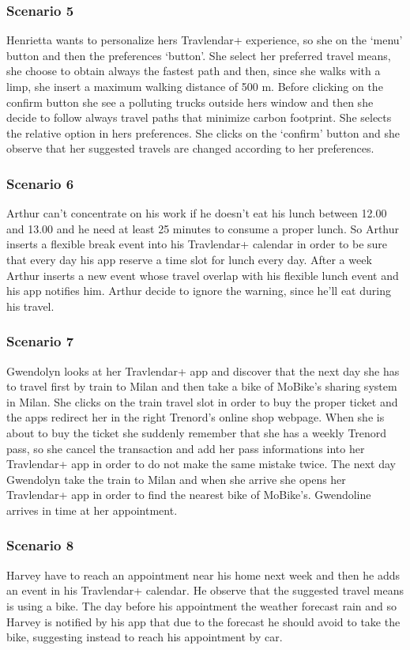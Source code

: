 	\subsubsection{Scenario 5}
		Henrietta wants to personalize hers Travlendar+ experience, so she on the ‘menu’ button and then the preferences ‘button’. She select her preferred travel means, she choose to obtain always the fastest path and then, since she walks with a limp, she insert a maximum walking distance of 500 m. Before clicking on the confirm button she see a polluting trucks outside hers window and then she decide to follow always travel paths that minimize carbon footprint. She selects the relative option in hers preferences. She clicks on the ‘confirm’ button and she observe that her suggested travels are changed according to her preferences.
	\subsubsection{Scenario 6}
		Arthur can’t concentrate on his work if he doesn't eat his lunch between 12.00 and 13.00 and he need at least 25 minutes to consume a proper lunch.
So Arthur inserts a flexible break event into his Travlendar+ calendar in order to be sure that every day his app reserve a time slot for lunch every day.
After a week Arthur inserts a new event whose travel overlap with his flexible lunch event and his app notifies him. Arthur decide to ignore the warning, since he'll eat during his travel.
	\subsubsection{Scenario 7}
		Gwendolyn looks at her Travlendar+ app and discover that the next day she has to travel first by train to Milan and then take a bike of MoBike’s sharing system in Milan. She clicks on the train travel slot in order to buy the proper ticket and the apps redirect her in the right Trenord’s online shop webpage. When she is about to buy the ticket she suddenly remember that she has a weekly Trenord pass, so she cancel the transaction and add her pass informations into her Travlendar+ app in order to do not make the same mistake twice. The next day Gwendolyn take the train to Milan and when she arrive she opens her Travlendar+ app in order to find the nearest bike of MoBike’s. Gwendoline arrives in time at her appointment.
	\subsubsection{Scenario 8}
		Harvey have to reach an appointment near his home next week and then he adds an event in his Travlendar+ calendar. He observe that the suggested travel means is using a bike. The day before his appointment the weather forecast rain and so Harvey is notified by his app that due to the forecast he should avoid to take the bike, suggesting instead to reach his appointment by car.
